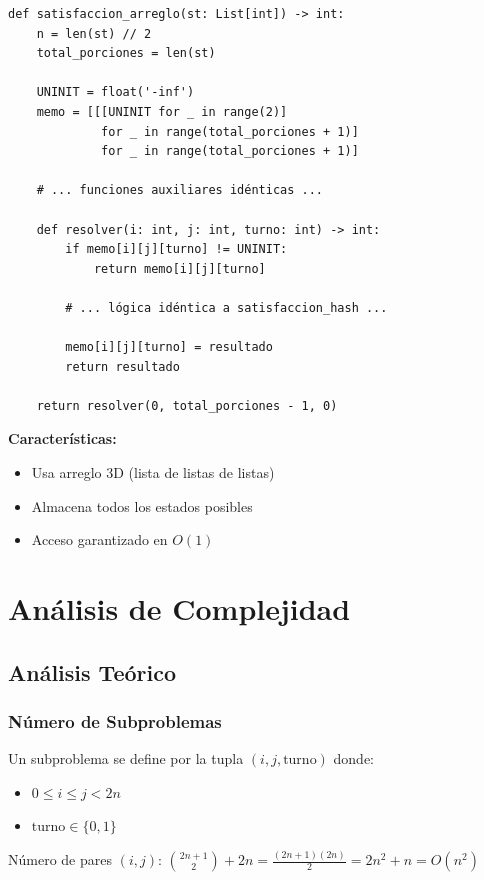 \documentclass[12pt,letterpaper]{article}
\begin{document}
\begin{lstlisting}
def satisfaccion_arreglo(st: List[int]) -> int:
    n = len(st) // 2
    total_porciones = len(st)
    
    UNINIT = float('-inf')
    memo = [[[UNINIT for _ in range(2)] 
             for _ in range(total_porciones + 1)]
             for _ in range(total_porciones + 1)]
    
    # ... funciones auxiliares idénticas ...
    
    def resolver(i: int, j: int, turno: int) -> int:
        if memo[i][j][turno] != UNINIT:
            return memo[i][j][turno]
        
        # ... lógica idéntica a satisfaccion_hash ...
        
        memo[i][j][turno] = resultado
        return resultado
    
    return resolver(0, total_porciones - 1, 0)
\end{lstlisting}

\textbf{Características:}
\begin{itemize}
    \item Usa arreglo 3D (lista de listas de listas)
    \item Almacena todos los estados posibles
    \item Acceso garantizado en $O(1)$
\end{itemize}

\section{Análisis de Complejidad}

\subsection{Análisis Teórico}

\subsubsection{Número de Subproblemas}

Un subproblema se define por la tupla $(i, j, \text{turno})$ donde:
\begin{itemize}
    \item $0 \leq i \leq j < 2n$
    \item $\text{turno} \in \{0, 1\}$
\end{itemize}

Número de pares $(i, j)$: $\binom{2n+1}{2} + 2n = \frac{(2n+1)(2n)}{2} = 2n^2 + n = O(n^2)$
\end{document}
